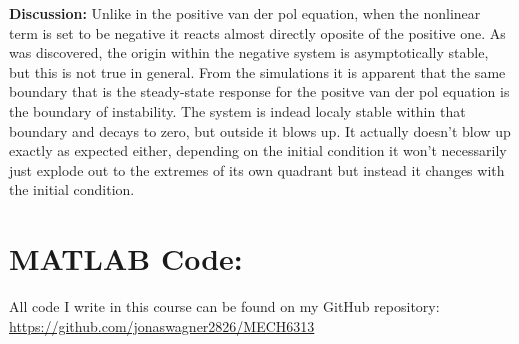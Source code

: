 \documentclass[letter]{article}
\begin{document}
\textbf{Discussion:}
Unlike in the positive van der pol equation, when the nonlinear term is set to be negative it reacts almost directly oposite of the positive one. As was discovered, the origin within the negative system is asymptotically stable, but this is not true in general. From the simulations it is apparent that the same boundary that is the steady-state response for the positve van der pol equation is the boundary of instability. The system is indead localy stable within that boundary and decays to zero, but outside it blows up. It actually doesn't blow up exactly as expected either, depending on the initial condition it won't necessarily just explode out to the extremes of its own quadrant but instead it changes with the initial condition.


\newpage
\appendix
\section{MATLAB Code:}
All code I write in this course can be found on my GitHub repository:\\
\href{https://github.com/jonaswagner2826/MECH6313}{https://github.com/jonaswagner2826/MECH6313}

\end{document}
